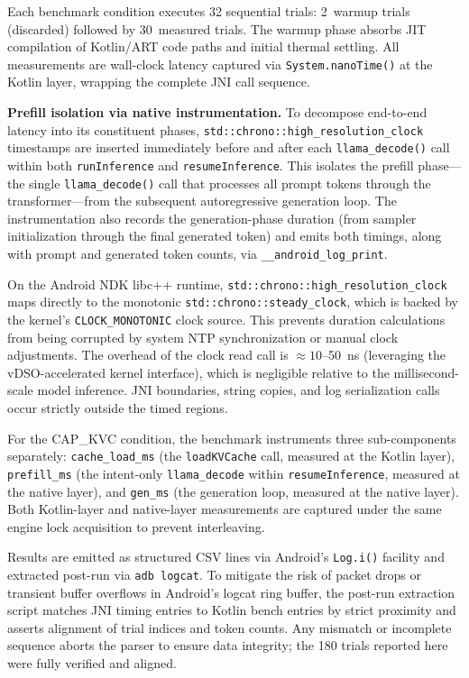 \documentclass[journal]{IEEEtran}
\begin{document}
Each benchmark condition executes 32 sequential trials: 2~warmup trials (discarded) followed by 30~measured trials. The warmup phase absorbs JIT compilation of Kotlin/ART code paths and initial thermal settling. All measurements are wall-clock latency captured via \texttt{System.nanoTime()} at the Kotlin layer, wrapping the complete JNI call sequence.

\textbf{Prefill isolation via native instrumentation.} To decompose end-to-end latency into its constituent phases, \texttt{std::chrono::high\_resolution\_clock} timestamps are inserted immediately before and after each \texttt{llama\_decode()} call within both \texttt{runInference} and \texttt{resumeInference}. This isolates the prefill phase---the single \texttt{llama\_decode()} call that processes all prompt tokens through the transformer---from the subsequent autoregressive generation loop. The instrumentation also records the generation-phase duration (from sampler initialization through the final generated token) and emits both timings, along with prompt and generated token counts, via \texttt{\_\_android\_log\_print}. 

On the Android NDK libc++ runtime, \texttt{std::chrono::high\_resolution\_clock} maps directly to the monotonic \texttt{std::chrono::steady\_clock}, which is backed by the kernel's \texttt{CLOCK\_MONOTONIC} clock source. This prevents duration calculations from being corrupted by system NTP synchronization or manual clock adjustments. The overhead of the clock read call is $\approx 10$--50~ns (leveraging the vDSO-accelerated kernel interface), which is negligible relative to the millisecond-scale model inference. JNI boundaries, string copies, and log serialization calls occur strictly outside the timed regions.

For the CAP\_KVC condition, the benchmark instruments three sub-components separately: \texttt{cache\_load\_ms} (the \texttt{loadKVCache} call, measured at the Kotlin layer), \texttt{prefill\_ms} (the intent-only \texttt{llama\_decode} within \texttt{resumeInference}, measured at the native layer), and \texttt{gen\_ms} (the generation loop, measured at the native layer). Both Kotlin-layer and native-layer measurements are captured under the same engine lock acquisition to prevent interleaving.

Results are emitted as structured CSV lines via Android's \texttt{Log.i()} facility and extracted post-run via \texttt{adb logcat}. To mitigate the risk of packet drops or transient buffer overflows in Android's logcat ring buffer, the post-run extraction script matches JNI timing entries to Kotlin bench entries by strict proximity and asserts alignment of trial indices and token counts. Any mismatch or incomplete sequence aborts the parser to ensure data integrity; the 180 trials reported here were fully verified and aligned.
\end{document}
